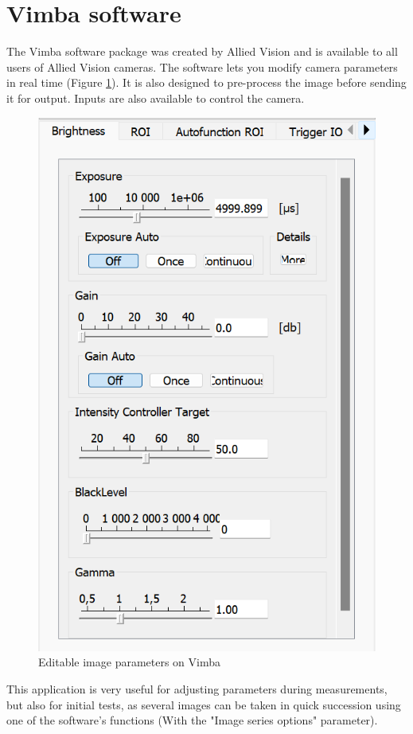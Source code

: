 \section{Vimba software}\label{sec:Vimba}
The Vimba software package was created by Allied Vision and is available to all users of Allied Vision cameras.
The software lets you modify camera parameters in real time (Figure \ref{fig:Soft_Vimba}). It is also designed to pre-process
the image before sending it for output. Inputs are also available to control the camera.
\begin{figure}[H]
    \centering
    \includegraphics[scale=0.85]{assets/figures/Software/VimbaInterface.png}
    \caption{Editable image parameters on Vimba}
    \label{fig:Soft_Vimba}
\end{figure}
This application is very useful for adjusting parameters during measurements, but also for initial tests, as several images can
be taken in quick succession using one of the software's functions (With the "Image series options" parameter).
\newpage
